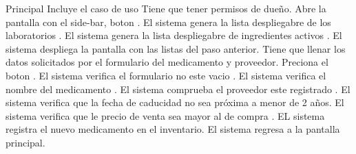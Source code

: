 	\begin{UCtrayectoria}{Principal}
		\UCpaso Incluye el caso de uso 
		\UCpaso [\UCactor] Tiene que tener permisos de dueño.
		\UCpaso [\UCactor] Abre la pantalla  con el side-bar, boton  .
		\UCpaso El sistema genera la lista despliegabre de los laboratorios .
		\UCpaso El sistema genera la lista despliegabre de ingredientes activos .%
		\UCpaso El sistema despliega la pantalla  con las listas del paso anterior.
		\UCpaso [\UCactor] Tiene que llenar los datos solicitados por el formulario del medicamento y proveedor.%
		\UCpaso	[\UCactor]Preciona el boton .%
		\UCpaso El sistema verifica el formulario no este vacio .
		\UCpaso	El sistema verifica el nombre del medicamento .
		\UCpaso El sistema comprueba el proveedor este registrado .
		\UCpaso El sistema verifica que la fecha de caducidad no sea próxima a menor de 2 años.
		\UCpaso El sistema verifica que le precio de venta sea mayor al de compra .
		\UCpaso EL sistema registra el nuevo medicamento en el inventario.
		\UCpaso El sistema regresa a la pantalla principal.
	\end{UCtrayectoria}

